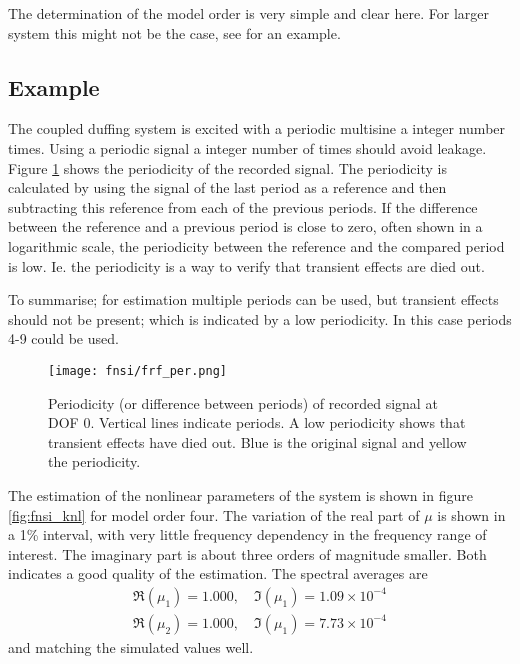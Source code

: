 The determination of the model order is very simple and clear here. For larger system this
might not be the case, see \autocite{noel2014a} for an example.


\subsection{Example}
\label{sec:fnsi_example}

The coupled duffing system is excited with a periodic multisine a integer
number times. Using a periodic signal a integer number of times should avoid
leakage\autocite{ewins2000a}.
Figure \ref{fig:periodicity} shows the periodicity of the recorded signal. The
periodicity is calculated by using the signal of the last period as a reference
and then subtracting this reference from each of the previous periods. If the
difference between the reference and a previous period is close to zero, often
shown in a logarithmic scale, the periodicity between the reference and the
compared period is low. Ie. the periodicity is a way to verify that transient
effects are died out.

To summarise; for estimation multiple periods can be used, but transient effects
should not be present; which is indicated by a low periodicity. In this case
periods 4-9 could be used.

\begin{figure}[!ht]
  \centering
  \texttt{[image: fnsi/frf\_per.png]}
  \caption{Periodicity (or difference between periods) of recorded signal at DOF
    0. Vertical lines indicate periods. A low periodicity shows that transient
    effects have died out. Blue is the original signal and yellow the
    periodicity.}
  \label{fig:periodicity}
\end{figure}


The estimation of the nonlinear parameters of the system is shown in figure
\ref{fig:fnsi_knl} for model order four. The variation of the real part of $\mu$
is shown in a 1\% interval, with very little frequency dependency in the
frequency range of interest. The imaginary part is about three orders of
magnitude smaller. Both indicates a good quality of the estimation. The spectral
averages are
\begin{equation}
  \begin{aligned}
    \Re (\mu_1) = 1.000, \quad \Im (\mu_1) = 1.09 \times 10^{-4} \\
    \Re (\mu_2) = 1.000, \quad \Im (\mu_1) = 7.73 \times 10^{-4}
  \end{aligned}
\end{equation}
and matching the simulated values well.

